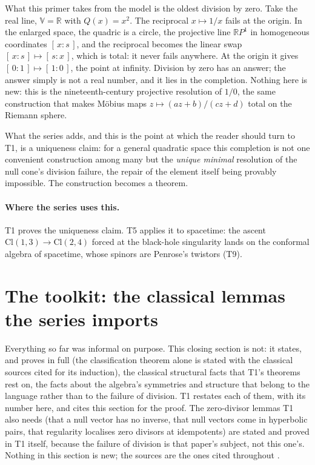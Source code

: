 \documentclass[11pt]{article}
\theoremstyle{plain}
\theoremstyle{definition}
\newcommand{\Cl}{\mathrm{Cl}}
\newcommand{\R}{\mathbb{R}}
\begin{document}
What this primer takes from the model is the oldest division by zero. Take the real line, $\mathbb{V} = \R$ with $Q(x) = x^{2}$. The reciprocal $x \mapsto 1/x$ fails at the origin. In the enlarged space, the quadric is a circle, the projective line $\R P^{1}$ in homogeneous coordinates $[\,x : s\,]$, and the reciprocal becomes the linear swap $[\,x : s\,] \mapsto [\,s : x\,]$, which is total: it never fails anywhere. At the origin it gives $[\,0 : 1\,] \mapsto [\,1 : 0\,]$, the point at infinity. Division by zero has an answer; the answer simply is not a real number, and it lies in the completion. Nothing here is new: this is the nineteenth-century projective resolution of $1/0$, the same construction that makes M\"obius maps $z \mapsto (az+b)/(cz+d)$ total on the Riemann sphere.

What the series adds, and this is the point at which the reader should turn to T1, is a uniqueness claim: for a general quadratic space this completion is not one convenient construction among many but the \emph{unique minimal} resolution of the null cone's division failure, the repair of the element itself being provably impossible. The construction becomes a theorem.

\paragraph{Where the series uses this.} T1 proves the uniqueness claim. T5 applies it to spacetime: the ascent $\Cl(1,3) \to \Cl(2,4)$ forced at the black-hole singularity lands on the conformal algebra of spacetime, whose spinors are Penrose's twistors (T9).

\section{The toolkit: the classical lemmas the series imports}\label{sec:toolkit}

Everything so far was informal on purpose. This closing section is not: it states, and proves in full (the classification theorem alone is stated with the classical sources cited for its induction), the classical structural facts that T1's theorems rest on, the facts about the algebra's symmetries and structure that belong to the language rather than to the failure of division. T1 restates each of them, with its number here, and cites this section for the proof. The zero-divisor lemmas T1 also needs (that a null vector has no inverse, that null vectors come in hyperbolic pairs, that regularity localises zero divisors at idempotents) are stated and proved in T1 itself, because the failure of division is that paper's subject, not this one's. Nothing in this section is new; the sources are the ones cited throughout \cite{Porteous1995, Lounesto2001, Lam2005, Chevalley1997, ABS1964}.
\end{document}
